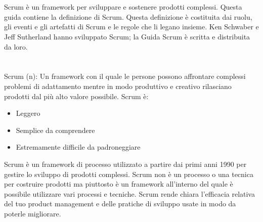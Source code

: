 
\section*{\color{Blue}{Scopo della Guida Scrum}}%
\label{sec:purpose}
Scrum \`e un framework per sviluppare e sostenere prodotti complessi. Questa guida contiene la definizione di Scrum. Questa definizione \`e 
costituita dai ruolu, gli eventi e gli artefatti di Scrum e le regole che li legano insieme. Ken Schwaber e Jeff Sutherland hanno sviluppato 
Scrum; la Guida Scrum \`e scritta e distribuita da loro.

\section*{\color{Blue}{Overview di Scrum}}%
\label{sec:overview}
Scrum (n): Un framework con il quale le persone possono affrontare complessi problemi di adattamento mentre in modo produttivo e creativo 
rilasciano prodotti dal pi\`u alto valore possibile. Scrum \`e:

\begin{itemize}
\item Leggero
\item Semplice da comprendere
\item Estremamente difficile da padroneggiare
\end{itemize}

Scrum \`e un framework di processo utilizzato a partire dai primi anni 1990 per gestire lo sviluppo di prodotti complessi. Scrum non \`e un 
processo o una tecnica per costruire prodotti ma piuttosto è un framework all'interno del quale \`e possibile utilizzare vari processi e 
tecniche. Scrum rende chiara l'efficacia relativa del tuo product management e delle pratiche di sviluppo usate in modo da poterle 
migliorare.

